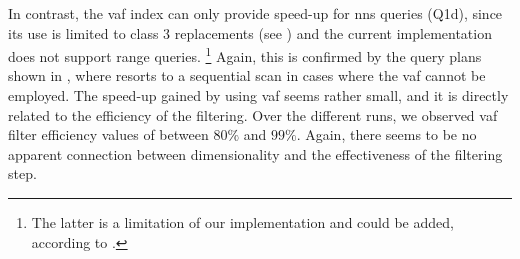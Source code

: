 In contrast, the \acrshort{vaf} index can only provide speed-up for \acrshort{nns} queries (Q1d), since its use is limited to class 3 replacements (see ) and the current implementation does not support range queries. \footnote{The latter is a limitation of our implementation and could be added, according to \cite{Weber:1998Va}.} Again, this is confirmed by the query plans shown in , where \cottontail{} resorts to a sequential scan in cases where the \acrshort{vaf} cannot be employed. The speed-up gained by using \acrshort{vaf} seems rather small, and it is directly related to the efficiency of the filtering. Over the different runs, we observed \acrshort{vaf} filter efficiency values of between $80\%$ and $99\%$. Again, there seems to be no apparent connection between dimensionality and the effectiveness of the filtering step.

